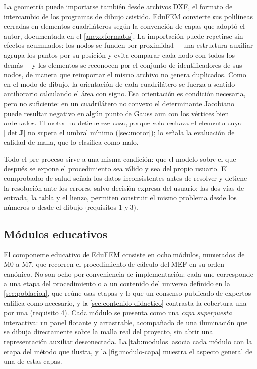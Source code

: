 La geometría puede importarse también desde archivos DXF, el formato de intercambio de los programas de dibujo asistido. EduFEM convierte sus polilíneas cerradas en elementos cuadriláteros según la convención de capas que adoptó el autor, documentada en el \autoref{anexo:formatos}. La importación puede repetirse sin efectos acumulados: los nodos se funden por proximidad —una estructura auxiliar agrupa los puntos por su posición y evita comparar cada nodo con todos los demás— y los elementos se reconocen por el conjunto de identificadores de sus nodos, de manera que reimportar el mismo archivo no genera duplicados. Como en el modo de dibujo, la orientación de cada cuadrilátero se fuerza a sentido antihorario calculando el área con signo. Esa orientación es condición necesaria, pero no suficiente: en un cuadrilátero no convexo el determinante Jacobiano puede resultar negativo en algún punto de Gauss aun con los vértices bien ordenados. El motor no detiene ese caso, porque solo rechaza el elemento cuyo $\lvert\det\bm{J}\rvert$ no supera el umbral mínimo (\autoref{sec:motor}); lo señala la evaluación de calidad de malla, que lo clasifica como malo.

Todo el pre-proceso sirve a una misma condición: que el modelo sobre el que después se expone el procedimiento sea válido y sea del propio usuario. El comprobador de salud señala los datos inconsistentes antes de resolver y detiene la resolución ante los errores, salvo decisión expresa del usuario; las dos vías de entrada, la tabla y el lienzo, permiten construir el mismo problema desde los números o desde el dibujo (requisitos 1 y 3).

\subsection{Módulos educativos}
\label{sec:educacion}

El componente educativo de EduFEM consiste en ocho módulos, numerados de M0 a M7, que recorren el procedimiento de cálculo del MEF en su orden canónico. No son ocho por conveniencia de implementación: cada uno corresponde a una etapa del procedimiento o a un contenido del universo definido en la \autoref{sec:poblacion}, que reúne esas etapas y lo que un consenso publicado de expertos califica como necesario, y la \autoref{sec:contenido-didactico} contrasta la cobertura una por una (requisito 4). Cada módulo se presenta como una \emph{capa superpuesta} interactiva: un panel flotante y arrastrable, acompañado de una iluminación que se dibuja directamente sobre la malla real del proyecto, sin abrir una representación auxiliar desconectada. La \autoref{tab:modulos} asocia cada módulo con la etapa del método que ilustra, y la \autoref{fig:modulo-capa} muestra el aspecto general de una de estas capas.

